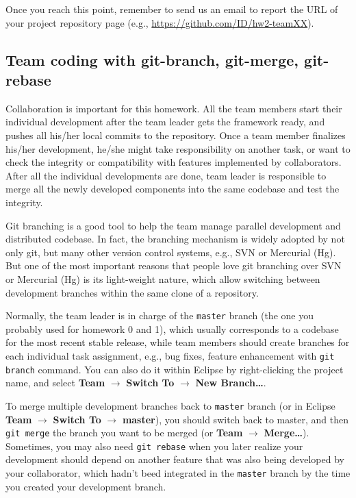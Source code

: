 Once you reach this point, remember to send us an email to report the URL of
your project repository page (e.g., \url{https://github.com/ID/hw2-teamXX}).

\subsection{Team coding with git-branch, git-merge, git-rebase}

Collaboration is important for this homework. All the team members start their
individual development after the team leader gets the framework ready, and
pushes all his/her local commits to the repository. Once a team member finalizes
his/her development, he/she might take responsibility on another task, or want
to check the integrity or compatibility with features implemented by
collaborators. After all the individual developments are done, team leader is
responsible to merge all the newly developed components into the same codebase
and test the integrity.

Git branching is a good tool to help the team manage parallel development and
distributed codebase. In fact, the branching mechanism is widely adopted by not
only git, but many other version control systems, e.g., SVN or Mercurial (Hg).
But one of the most important reasons that people love git branching over SVN or
Mercurial (Hg) is its light-weight nature, which allow switching between
development branches within the same clone of a repository.

Normally, the team leader is in charge of the \texttt{master} branch (the one
you probably used for homework 0 and 1), which usually corresponds to a codebase
for the most recent stable release, while team members should create branches
for each individual task assignment, e.g., bug fixes, feature enhancement with
\texttt{git branch} command. You can also do it within Eclipse by right-clicking
the project name, and select \textbf{Team} $\rightarrow$ \textbf{Switch To}
$\rightarrow$ \textbf{New Branch\ldots}.

To merge multiple development branches back to \texttt{master} branch (or in
Eclipse \textbf{Team} $\rightarrow$ \textbf{Switch To} $\rightarrow$
\textbf{master}), you should switch back to master, and then \texttt{git merge}
the branch you want to be merged (or \textbf{Team} $\rightarrow$
\textbf{Merge\ldots}). Sometimes, you may also need \texttt{git rebase} when you
later realize your development should depend on another feature that was also
being developed by your collaborator, which hadn't beed integrated in the
\texttt{master} branch by the time you created your development branch.


